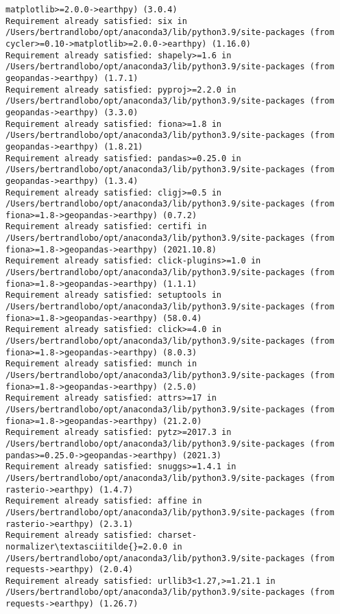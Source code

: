 \documentclass[11pt]{article}
\begin{document}
\begin{Verbatim}[commandchars=\\\{\}]
matplotlib>=2.0.0->earthpy) (3.0.4)
Requirement already satisfied: six in
/Users/bertrandlobo/opt/anaconda3/lib/python3.9/site-packages (from
cycler>=0.10->matplotlib>=2.0.0->earthpy) (1.16.0)
Requirement already satisfied: shapely>=1.6 in
/Users/bertrandlobo/opt/anaconda3/lib/python3.9/site-packages (from
geopandas->earthpy) (1.7.1)
Requirement already satisfied: pyproj>=2.2.0 in
/Users/bertrandlobo/opt/anaconda3/lib/python3.9/site-packages (from
geopandas->earthpy) (3.3.0)
Requirement already satisfied: fiona>=1.8 in
/Users/bertrandlobo/opt/anaconda3/lib/python3.9/site-packages (from
geopandas->earthpy) (1.8.21)
Requirement already satisfied: pandas>=0.25.0 in
/Users/bertrandlobo/opt/anaconda3/lib/python3.9/site-packages (from
geopandas->earthpy) (1.3.4)
Requirement already satisfied: cligj>=0.5 in
/Users/bertrandlobo/opt/anaconda3/lib/python3.9/site-packages (from
fiona>=1.8->geopandas->earthpy) (0.7.2)
Requirement already satisfied: certifi in
/Users/bertrandlobo/opt/anaconda3/lib/python3.9/site-packages (from
fiona>=1.8->geopandas->earthpy) (2021.10.8)
Requirement already satisfied: click-plugins>=1.0 in
/Users/bertrandlobo/opt/anaconda3/lib/python3.9/site-packages (from
fiona>=1.8->geopandas->earthpy) (1.1.1)
Requirement already satisfied: setuptools in
/Users/bertrandlobo/opt/anaconda3/lib/python3.9/site-packages (from
fiona>=1.8->geopandas->earthpy) (58.0.4)
Requirement already satisfied: click>=4.0 in
/Users/bertrandlobo/opt/anaconda3/lib/python3.9/site-packages (from
fiona>=1.8->geopandas->earthpy) (8.0.3)
Requirement already satisfied: munch in
/Users/bertrandlobo/opt/anaconda3/lib/python3.9/site-packages (from
fiona>=1.8->geopandas->earthpy) (2.5.0)
Requirement already satisfied: attrs>=17 in
/Users/bertrandlobo/opt/anaconda3/lib/python3.9/site-packages (from
fiona>=1.8->geopandas->earthpy) (21.2.0)
Requirement already satisfied: pytz>=2017.3 in
/Users/bertrandlobo/opt/anaconda3/lib/python3.9/site-packages (from
pandas>=0.25.0->geopandas->earthpy) (2021.3)
Requirement already satisfied: snuggs>=1.4.1 in
/Users/bertrandlobo/opt/anaconda3/lib/python3.9/site-packages (from
rasterio->earthpy) (1.4.7)
Requirement already satisfied: affine in
/Users/bertrandlobo/opt/anaconda3/lib/python3.9/site-packages (from
rasterio->earthpy) (2.3.1)
Requirement already satisfied: charset-normalizer\textasciitilde{}=2.0.0 in
/Users/bertrandlobo/opt/anaconda3/lib/python3.9/site-packages (from
requests->earthpy) (2.0.4)
Requirement already satisfied: urllib3<1.27,>=1.21.1 in
/Users/bertrandlobo/opt/anaconda3/lib/python3.9/site-packages (from
requests->earthpy) (1.26.7)

\end{Verbatim}
\end{document}
